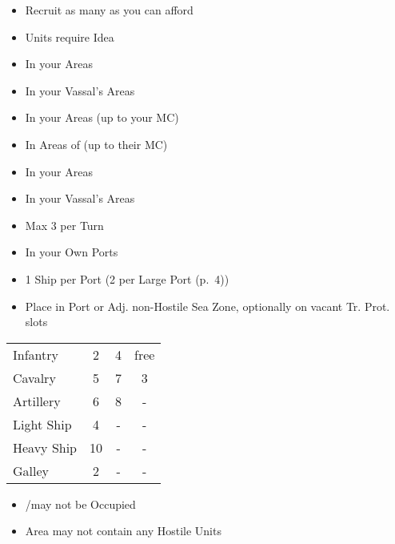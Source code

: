 \documentclass[10pt]{article}
\begin{document}
\begin{itemize}
	\item Recruit as many as you can afford
	\item {} Units require  Idea 
\end{itemize}
\begin{itemize}
	\item In your Areas
	\item In your Vassal's Areas
\end{itemize}
\begin{itemize}
	\item In your Areas (up to your MC)
	\item In Areas of \activeallies (up to their MC)
\end{itemize}
\begin{itemize}
	\item In your Areas
	\item In your Vassal's Areas
	\item Max 3 per Turn
\end{itemize}
\begin{itemize}
	\item In your Own Ports
	\item 1 Ship per Port (2 per Large Port (p.~4))
	\item Place in Port or Adj. non-Hostile Sea Zone, optionally on vacant Tr. Prot. slots
\end{itemize}
\begin{tabularx}{\columnwidth}{ | l | C | C | C | }
	\hline
	\null &  &  &  \\ \hline
	Infantry & 2\ducats & 4\ducats & free \\ \hline
	Cavalry & 5\ducats & 7\ducats & 3\ducats \\ \hline
	Artillery & 6\ducats & 8\ducats & - \\ \hline
	Light Ship & 4\ducats & - & - \\ \hline
	Heavy Ship & 10\ducats & - & - \\ \hline
	Galley & 2\ducats & - & - \\ \hline
\end{tabularx}

\begin{itemize}
	\item \town/\vassal may not be Occupied
	\item Area may not contain any Hostile Units
\end{itemize}
\end{document}
